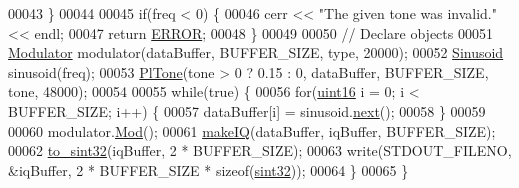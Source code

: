 \begin{DoxyCode}
00043     \}
00044 
00045     \textcolor{keywordflow}{if}(freq < 0) \{
00046         cerr << \textcolor{stringliteral}{"The given tone was invalid."} << endl;
00047         \textcolor{keywordflow}{return} \hyperlink{definitions_8hpp_a8fe83ac76edc595f6b98cd4a4127aed5}{ERROR};
00048     \}
00049 
00050     \textcolor{comment}{// Declare objects}
00051     \hyperlink{classradio_1_1Modulator}{Modulator} modulator(dataBuffer, BUFFER\_SIZE, type, 20000);
00052     \hyperlink{classradio_1_1Sinusoid}{Sinusoid} sinusoid(freq);
00053     \hyperlink{classradio_1_1PlTone}{PlTone}(tone > 0 ? 0.15 : 0, dataBuffer, BUFFER\_SIZE, tone, 48000);
00054 
00055     \textcolor{keywordflow}{while}(\textcolor{keyword}{true}) \{
00056         \textcolor{keywordflow}{for}(\hyperlink{definitions_8hpp_a05f6b0ae8f6a6e135b0e290c25fe0e4e}{uint16} i = 0; i < BUFFER\_SIZE; i++) \{
00057             dataBuffer[i] = sinusoid.\hyperlink{classradio_1_1Sinusoid_aab44298ea1bd5cb175d5826243cf56f2}{next}();
00058         \}
00059 
00060         modulator.\hyperlink{classradio_1_1Modulator_ab5eac6e4900579486b5871b48e64cdab}{Mod}();
00061         \hyperlink{namespaceradio_a7166522e76ff88e8d482491b1b6e2275}{makeIQ}(dataBuffer, iqBuffer, BUFFER\_SIZE);
00062         \hyperlink{namespaceradio_ae4b2334c4366dcdf0311ad79d2067945}{to\_sint32}(iqBuffer, 2 * BUFFER\_SIZE);
00063         write(STDOUT\_FILENO, &iqBuffer,  2 * BUFFER\_SIZE * \textcolor{keyword}{sizeof}(\hyperlink{definitions_8hpp_a0573de65958b4fda3a0460ed417dafb8}{sint32}));
00064     \}
00065 \}
\end{DoxyCode}
